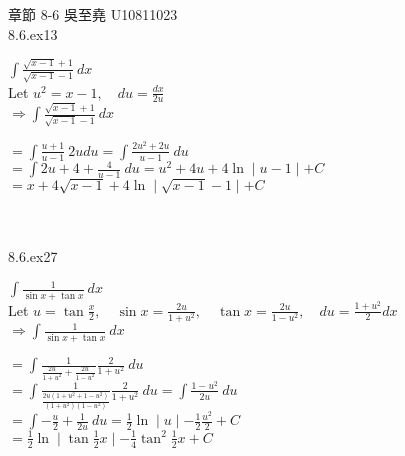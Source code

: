 \documentclass[12pt]{book}
\author{andersonwu2000}
\begin{document}
\begin{CJK}{UTF8}{bsmi}

\hfill 章節 8-6 吳至堯 U10811023 \\

8.6.ex13 \begin{minipage}[t]{\dimexpr\linewidth}
$\displaystyle\int\frac{\sqrt{x-1}+1}{\sqrt{x-1}-1}\ dx$ \\
Let $\displaystyle u^2 = x-1,\quad du=\frac{dx}{2u}$ \\
$\displaystyle\Rightarrow\int \frac{\sqrt{x-1}+1}{\sqrt{x-1}-1}\ dx$ \begin{minipage}[t]{\dimexpr\linewidth}
$\displaystyle=\int\frac{u+1}{u-1}\ 2udu=\int\frac{2u^2+2u}{u-1}\ du$ \\
$\displaystyle=\int 2u+4+\frac{4}{u-1}\ du=u^2+4u+4\ln\mid u-1\mid+C$ \\
$\displaystyle=x+4\sqrt{x-1}+4\ln\mid\sqrt{x-1}-1\mid+C$
\end{minipage}
\end{minipage} \\\\

8.6.ex27 \begin{minipage}[t]{\dimexpr\linewidth}
$\displaystyle\int\frac{1}{\sin x+\tan x}\ dx$ \\
Let $\displaystyle u=\tan\frac{x}{2},\quad\sin x=\frac{2u}{1+u^2},\quad\tan x=\frac{2u}{1-u^2},\quad du=\frac{1+u^2}{2}dx$ \\
$\displaystyle\Rightarrow\int\frac{1}{\sin x+\tan x}\ dx$ \begin{minipage}[t]{\dimexpr\linewidth}
$\displaystyle=\int\frac{1}{\frac{2u}{1+u^2}+\frac{2u}{1-u^2}}\frac{2}{1+u^2}\ du$ \\ $\displaystyle=\int\frac{1}{\frac{2u(1+u^2+1-u^2)}{(1+u^2)(1-u^2)}}\frac{2}{1+u^2}\ du=\int\frac{1-u^2}{2u}\ du$ \\
$\displaystyle=\int-\frac{u}{2}+\frac{1}{2u}\ du=\frac{1}{2}\ln\mid u\mid-\frac{1}{2}\frac{u^2}{2}+C$ \\
$\displaystyle=\frac{1}{2}\ln\mid\tan\frac{1}{2}x\mid-\frac{1}{4}\tan^2\frac{1}{2}x+C$
\end{minipage}
\end{minipage}

\end{CJK}
\end{document}
